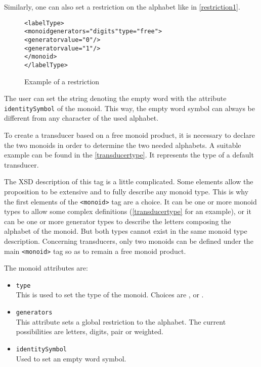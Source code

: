 \documentclass[a4paper]{article}
\newcommand{\xtag}[1]{\texttt{<#1>}}
\newcommand{\xattr}[1]{\texttt{#1}}
\begin{document}
Similarly, one can also set a restriction on the alphabet like in
\autoref{restriction1}.

\begin{figure}[ht]
  \small
  \begin{center}
\begin{alltt}
<labelType>
  <monoid generators="digits" type="free">
    <generator value="0"/>
    <generator value="1"/>
  </monoid>
</labelType>
\end{alltt}

\caption{Example of a restriction}
\label{restriction1}
  \end{center}
\end{figure}


The user can set the string denoting the empty word with the attribute
\xattr{identitySymbol} of the monoid. This way, the empty word
symbol can always be different from any character of the used
alphabet.

To create a transducer based on a free monoid product, it is necessary
to declare the two monoids in order to determine the two needed
alphabets. A suitable example can be found in the
\autoref{transducertype}. It represents the type of a default
transducer.

The XSD description of this tag is a little complicated. Some elements
allow the proposition to be extensive and to fully describe any monoid
type. This is why the first elements of the \xtag{monoid} tag are a
choice. It can be one or more monoid types to allow some complex
definitions (\autoref{transducertype} for an example), or it can
be one or more generator types to describe the letters composing the
alphabet of the monoid. But both types cannot exist in the same monoid
type description. Concerning transducers, only two monoids can be
defined under the main \xtag{monoid} tag so as to remain a free monoid
product.

The monoid attributes are:
\begin{itemize}
\item \xattr{type}\\
  This is used to set the type of the monoid. Choices are ,
   or .
\item \xattr{generators}\\
  This attribute sets a global restriction to the alphabet. The
  current possibilities are letters, digits, pair or weighted.
\item \xattr{identitySymbol}\\
  Used to set an empty word symbol.
\end{itemize}
\end{document}
